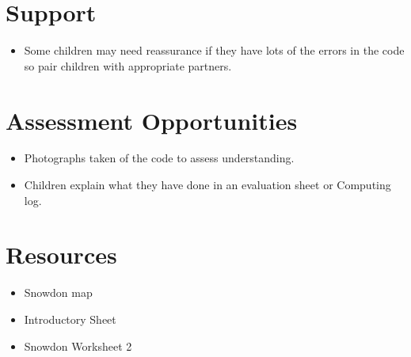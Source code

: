 \documentclass{geocraft-lesson-plan}
\begin{document}
\section*{Support}
\begin{itemize}
\item Some children may need reassurance if they have lots of the
  errors in the code so pair children with appropriate partners. 
\end{itemize}

\section*{Assessment Opportunities}
\begin{itemize}
\item Photographs taken of the code to assess understanding. 
\item Children explain what they have done in an evaluation sheet or
  Computing log.  
\end{itemize}



\section*{Resources}
\begin{itemize}
\item Snowdon map 
\item Introductory Sheet
\item Snowdon Worksheet 2
\end{itemize}

\end{document}
